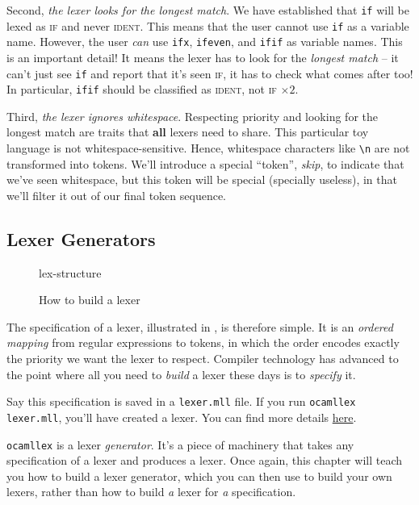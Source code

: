 Second, \emph{the lexer looks for the longest match}. We have established that \texttt{if} will be lexed as \textsc{if} and never \textsc{ident}. This means that the user cannot use \texttt{if} as a variable name. However, the user \emph{can} use \texttt{ifx}, \texttt{ifeven}, and \texttt{ifif} as variable names. This is an important detail! It means the lexer has to look for the \emph{longest match} -- it can't just see \texttt{if} and report that it's seen \textsc{if}, it has to check what comes after too! In particular, \texttt{ifif} should be classified as \textsc{ident}, not \textsc{if} $\times 2$.

Third, \emph{the lexer ignores whitespace}. Respecting priority and looking for the longest match are traits that \textbf{all} lexers need to share. This particular toy language is not whitespace-sensitive. Hence, whitespace characters like \verb|\n| are not transformed into tokens. We'll introduce a special ``token'', \emph{skip}, to indicate that we've seen whitespace, but this token will be special (specially useless), in that we'll filter it out of our final token sequence. 

\subsection{Lexer Generators}
\begin{figure}[H]
    \begin{center}
        {lex-structure}
    \end{center}
    \caption{How to build a lexer}
    \label{fig:build-lexer}
\end{figure}

The specification of a lexer, illustrated in , is therefore simple. It is an \emph{ordered mapping} from regular expressions to tokens, in which the order encodes exactly the priority we want the lexer to respect. Compiler technology has advanced to the point where all you need to \textit{build} a lexer these days is to \textit{specify} it.

Say this specification is saved in a \texttt{lexer.mll} file. If you run \texttt{ocamllex lexer.mll}, you'll have created a lexer. You can find more details \href{https://ocaml.org/manual/5.2/lexyacc.html}{here}.

\texttt{ocamllex} is a lexer \emph{generator}. It's a piece of machinery that takes any specification of a lexer and produces a lexer. Once again, this chapter will teach you how to build a lexer generator, which you can then use to build your own lexers, rather than how to build \textit{a} lexer for \textit{a} specification.

